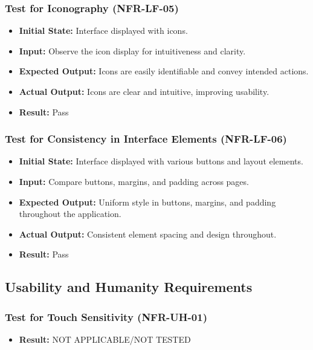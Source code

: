 \documentclass[12pt, titlepage]{article}
\begin{document}
\subsubsection{Test for Iconography (NFR-LF-05)}
\begin{itemize}
    \item \textbf{Initial State: }Interface displayed with icons.
    \item \textbf{Input: }Observe the icon display for intuitiveness and clarity.
    \item \textbf{Expected Output: }Icons are easily identifiable and convey intended actions.
    \item \textbf{Actual Output: }Icons are clear and intuitive, improving usability.
    \item \textbf{Result: }Pass
\end{itemize}

\subsubsection{Test for Consistency in Interface Elements (NFR-LF-06)}
\begin{itemize}
    \item \textbf{Initial State: }Interface displayed with various buttons and layout elements.
    \item \textbf{Input: }Compare buttons, margins, and padding across pages.
    \item \textbf{Expected Output: }Uniform style in buttons, margins, and padding throughout the application.
    \item \textbf{Actual Output: }Consistent element spacing and design throughout.
    \item \textbf{Result: }Pass
\end{itemize}

\subsection{Usability and Humanity Requirements}

\subsubsection{Test for Touch Sensitivity (NFR-UH-01)}
\begin{itemize}
    \item \textbf{Result: }NOT APPLICABLE/NOT TESTED
\end{itemize}
\end{document}
